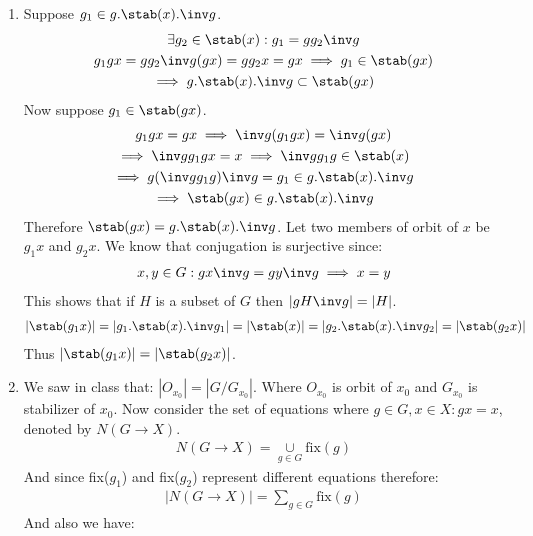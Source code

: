 
\begin{enumerate}[label=\ilabel]
    \item 
        Suppose $g_1 \in g.\stab(x).\inv g$.
        \begin{gather*}
            \exists g_2 \in \stab(x): g_1 = g g_2 \inv g \\
            g_1 gx = g g_2 \inv g (gx) = g g_2x = gx \implies g_1 \in \stab(gx)\\
            \implies g.\stab(x).\inv g \subset \stab(gx)
        \end{gather*}
        Now suppose $g_1 \in \stab(gx)$.
        \begin{gather*}
            g_1 gx = gx \implies \inv g (g_1gx) = \inv g (gx) \\
            \implies \inv g g_1 gx = x \implies \inv g g_1 g \in \stab(x) \\
            \implies g(\inv g g_1 g) \inv g = g_1 \in g.\stab(x).\inv g \\
            \implies \stab(gx) \in g.\stab(x).\inv g
        \end{gather*}
        Therefore $\stab(gx) = g.\stab(x).\inv g$.
        Let two members of orbit of $x$ be $g_1x$ and $g_2x$. We know that conjugation is surjective since:
        \begin{gather*}
            x, y \in G: gx\inv g = g y \inv g \implies x = y
        \end{gather*}
        This shows that if $H$ is a subset of $G$ then $|gH\inv g| = |H|$.
        \begin{gather*}
            |\stab(g_1x)| = |g_1.\stab(x).\inv g_1| = |\stab(x)| = |g_2.\stab(x).\inv g_2| = |\stab(g_2x)|
        \end{gather*}
        Thus $|\stab(g_1x)| = |\stab(g_2x)|$.
    \item      
        We saw in class that: $|O_{x_0}| = |G/G_{x_0}|$. Where $O_{x_0}$ is orbit of $x_0$ and $G_{x_0}$ is stabilizer of $x_0$.
        Now consider the set of equations where $g \in G, x \in X: gx = x$, denoted by $N(G \to X)$.
        \begin{gather*}
            N(G \to X) = \underset{g \in G}{\cup} \text{fix}(g)
        \end{gather*}
        And since fix($g_1$) and fix($g_2$) represent different equations therefore:
        \begin{gather*}
            |N(G \to X)| = \underset{g \in G }{\sum}\text{fix}(g)
        \end{gather*}
        And also we have:

\end{enumerate}
